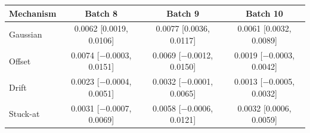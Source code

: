 \begin{tabular}{lccc}
\toprule
Mechanism & Batch 8 & Batch 9 & Batch 10 \\
\midrule
Gaussian & 0.0062 [0.0019, 0.0106] & 0.0077 [0.0036, 0.0117] & 0.0061 [0.0032, 0.0089] \\
Offset & 0.0074 [$-$0.0003, 0.0151] & 0.0069 [$-$0.0012, 0.0150] & 0.0019 [$-$0.0003, 0.0042] \\
Drift & 0.0023 [$-$0.0004, 0.0051] & 0.0032 [$-$0.0001, 0.0065] & 0.0013 [$-$0.0005, 0.0032] \\
Stuck-at & 0.0031 [$-$0.0007, 0.0069] & 0.0058 [$-$0.0006, 0.0121] & 0.0032 [0.0006, 0.0059] \\
\bottomrule
\end{tabular}
